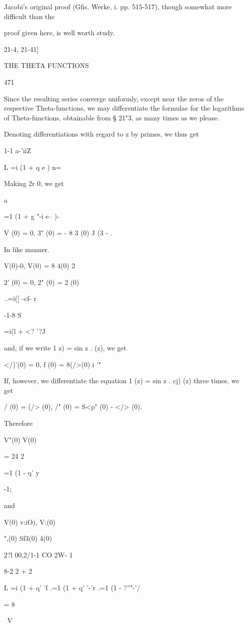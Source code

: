 Jacobi's original proof (Gfis. Werke, i. pp. 515-517), though somewhat
more difficult than the

proof given here, is well worth study.

21-4, 21-41]

THE THETA FUNCTIONS

471

Since the resulting series converge uniformly, except near the zeros
of the respective Theta-functions, we may differentiate the formulae
for the logarithms of Theta-functions, obtainable from § 21"3, as many
times as we please.

Denoting differentiations with regard to z by primes, we thus get


1-1 a-'iiZ

L =i (1 + q e ) n=\

Making 2r 0, we get

a%

=1 (1 + g "-i e-- )-

V (0) = 0, 3" (0) = - 8 3 (0) J (3 - .

In like manner.

V(0)-0, V(0) = 8 4(0) 2

 2' (0) = 0, 2" (0) = 2 (0)

..=i(] -cf- r

-1-8 S

 =i(l + <? '?J

and, if we write 1 z) = sin z . (z), we get

</)'(0) = 0, f (0) = 8(/>(0) i '"

If, however, we differentiate the equation 1 (z) = sin z . cj) (z)
three times, we get

 / (0) = (/> (0), /" (0) = S<p" (0) - </> (0).

Therefore

V"(0) V(0)

= 24 2

=1 (1 - q' y

-1;

and

V(0) v:iO), V:(0)

",(0) Sf3(0) 4(0)

 2?l 00,2/1-1 CO 2W- 1

8-2 2 + 2

L =i (1 + q' 'f .=1 (1 + q' '-'r .=1 (1 - ?''"-'/

= 8

\ V

